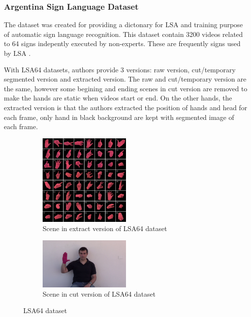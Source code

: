 \documentclass[a4paper, 12pt]{article}
\begin{document}
\subsubsection{Argentina Sign Language Dataset}
The dataset was created for providing a dictonary for LSA and training purpose of automatic sign language recognition. This dataset contain 3200 videos related to 64 signs indepently executed by non-experts. These are frequently signs used by LSA \citep{Ronchetti2016}.

With LSA64 datasets, authors provide 3 versions: raw version, cut/temporary segmented version and extracted version. The raw and cut/temporary version are the same, however some begining and ending scenes in cut version are removed to make the hands are static when videos start or end. On the other hands, the extracted version is that the authors extracted the position of hands and head for each frame, only hand in black background are kept with segmented image of each frame.

\begin{figure}[H]
    \centering
    \begin{subfigure}[b]{0.5\textwidth}
        \centering    
        \includegraphics[width=0.5\textwidth]{LSA64_handshapes_grid_8x8.png}
        \caption{Scene in extract version of LSA64 dataset}
    \end{subfigure}
    \hfill
    \begin{subfigure}[b]{0.5\textwidth}
        \centering    
        \includegraphics[width=0.5\textwidth]{LSA64.png}
        \caption{Scene in cut version of LSA64 dataset}
    \end{subfigure}
    \caption{LSA64 dataset}
    \label{LSA64}
\end{figure}
\end{document}
